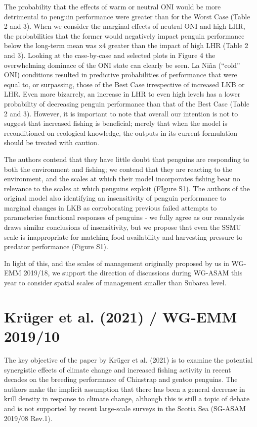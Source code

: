 \documentclass[]{elsarticle} %
\begin{document}
The probability that the effects of warm or neutral ONI would be more
detrimental to penguin performance were greater than for the Worst Case
(Table 2 and 3). When we consider the marginal effects of neutral ONI
and high LHR, the probabilities that the former would negatively impact
penguin performance below the long-term mean was x4 greater than the
impact of high LHR (Table 2 and 3). Looking at the case-by-case and
selected plots in Figure 4 the overwhelming dominace of the ONI state
can clearly be seen. La Niña (``cold'' ONI) conditions resulted in
predictive probabilities of performance that were equal to, or
surpassing, those of the Best Case irrespective of increased LKB or LHR.
Even more bizarrely, an increase in LHR to even high levels has a lower
probability of decreasing penguin performance than that of the Best Case
(Table 2 and 3). However, it is important to note that overall our
intention is not to suggest that increased fishing is beneficial; merely
that when the model is reconditioned on ecological knowledge, the
outputs in its current formulation should be treated with caution.

The authors contend that they have little doubt that penguins are
responding to both the environment and fishing; we contend that they are
reacting to the environment, and the scales at which their model
incorporates fishing bear no relevance to the scales at which penguins
exploit (FIgure S1). The authors of the original model also identifying
an insensitivity of penguin performance to marginal changes in LKB as
corroborating previous failed attempts to parameterise functional
responses of penguins - we fully agree as our reanalysis draws similar
conclusions of insensitivity, but we propose that even the SSMU scale is
inappropriate for matching food availability and harvesting pressure to
predator performance (Figure S1).

In light of this, and the scales of management originally proposed by us
in WG-EMM 2019/18, we support the direction of discussions during
WG-ASAM this year to consider spatial scales of management smaller than
Subarea level.

\hypertarget{kruger2021-wg-emm-201910}{%
\section{Krüger et al. (2021) / WG-EMM
2019/10}\label{kruger2021-wg-emm-201910}}

The key objective of the paper by Krüger et al. (2021) is to examine the
potential synergistic effects of climate change and increased fishing
activity in recent decades on the breeding performance of Chinstrap and
gentoo penguins. The authors make the implicit assumption that there has
been a general decrease in krill density in response to climate change,
although this is still a topic of debate and is not supported by recent
large-scale surveys in the Scotia Sea (SG-ASAM 2019/08 Rev.1).
\end{document}
